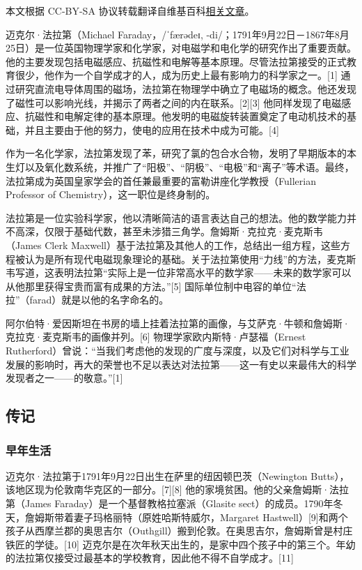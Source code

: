 
本文根据 CC-BY-SA 协议转载翻译自维基百科\href{https://en.wikipedia.org/wiki/Stokes\%27_theorem}{相关文章}。

迈克尔·法拉第（Michael Faraday，/ˈfærədeɪ, -di/；1791年9月22日－1867年8月25日）是一位英国物理学家和化学家，对电磁学和电化学的研究作出了重要贡献。他的主要发现包括电磁感应、抗磁性和电解等基本原理。尽管法拉第接受的正式教育很少，他作为一个自学成才的人，成为历史上最有影响力的科学家之一。[1] 通过研究直流电导体周围的磁场，法拉第在物理学中确立了电磁场的概念。他还发现了磁性可以影响光线，并揭示了两者之间的内在联系。[2][3] 他同样发现了电磁感应、抗磁性和电解定律的基本原理。他发明的电磁旋转装置奠定了电动机技术的基础，并且主要由于他的努力，使电的应用在技术中成为可能。[4]

作为一名化学家，法拉第发现了苯，研究了氯的包合水合物，发明了早期版本的本生灯以及氧化数系统，并推广了“阳极”、“阴极”、“电极”和“离子”等术语。最终，法拉第成为英国皇家学会的首任兼最重要的富勒讲座化学教授（Fullerian Professor of Chemistry），这一职位是终身制的。

法拉第是一位实验科学家，他以清晰简洁的语言表达自己的想法。他的数学能力并不高深，仅限于基础代数，甚至未涉猎三角学。詹姆斯·克拉克·麦克斯韦（James Clerk Maxwell）基于法拉第及其他人的工作，总结出一组方程，这些方程被认为是所有现代电磁现象理论的基础。关于法拉第使用“力线”的方法，麦克斯韦写道，这表明法拉第“实际上是一位非常高水平的数学家——未来的数学家可以从他那里获得宝贵而富有成果的方法。”[5] 国际单位制中电容的单位“法拉”（farad）就是以他的名字命名的。

阿尔伯特·爱因斯坦在书房的墙上挂着法拉第的画像，与艾萨克·牛顿和詹姆斯·克拉克·麦克斯韦的画像并列。[6] 物理学家欧内斯特·卢瑟福（Ernest Rutherford）曾说：“当我们考虑他的发现的广度与深度，以及它们对科学与工业发展的影响时，再大的荣誉也不足以表达对法拉第——这一有史以来最伟大的科学发现者之一——的敬意。”[1]
\subsection{传记}
\subsubsection{早年生活}
迈克尔·法拉第于1791年9月22日出生在萨里的纽因顿巴茨（Newington Butts），该地区现为伦敦南华克区的一部分。[7][8] 他的家境贫困。他的父亲詹姆斯·法拉第（James Faraday）是一个基督教格拉塞派（Glasite sect）的成员。1790年冬天，詹姆斯带着妻子玛格丽特（原姓哈斯特威尔，Margaret Hastwell）[9]和两个孩子从西摩兰郡的奥思吉尔（Outhgill）搬到伦敦。在奥思吉尔，詹姆斯曾是村庄铁匠的学徒。[10] 迈克尔是在次年秋天出生的，是家中四个孩子中的第三个。年幼的法拉第仅接受过最基本的学校教育，因此他不得不自学成才。[11]

